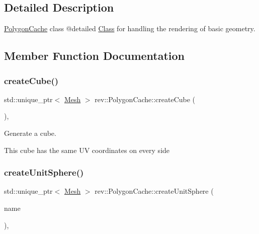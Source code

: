\subsection{Detailed Description}
\mbox{\hyperlink{classrev_1_1_polygon_cache}{Polygon\+Cache}} class @detailed \mbox{\hyperlink{struct_class}{Class}} for handling the rendering of basic geometry. 

\subsection{Member Function Documentation}
\mbox{\label{classrev_1_1_polygon_cache_aafe80ec3d7b68ae60fbcefae0ba71001}} 
\subsubsection{\texorpdfstring{createCube()}{createCube()}}
{\footnotesize\ttfamily std\+::unique\+\_\+ptr$<$ \mbox{\hyperlink{classrev_1_1_mesh}{Mesh}} $>$ rev\+::\+Polygon\+Cache\+::create\+Cube (\begin{DoxyParamCaption}{ }\end{DoxyParamCaption})\hspace{0.3cm}{\ttfamily [static]}, {\ttfamily [protected]}}



Generate a cube. 

This cube has the same UV coordinates on every side \mbox{\label{classrev_1_1_polygon_cache_a3fe01a9dbddcbca577c7c4eecb378e7c}} 
\subsubsection{\texorpdfstring{createUnitSphere()}{createUnitSphere()}}
{\footnotesize\ttfamily std\+::unique\+\_\+ptr$<$ \mbox{\hyperlink{classrev_1_1_mesh}{Mesh}} $>$ rev\+::\+Polygon\+Cache\+::create\+Unit\+Sphere (\begin{DoxyParamCaption}\item[{const \mbox{\hyperlink{classrev_1_1_g_string}{G\+String}} \&}]{name }\end{DoxyParamCaption})\hspace{0.3cm}{\ttfamily [static]}, {\ttfamily [protected]}}



